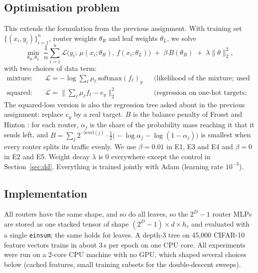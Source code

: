 \subsection{Optimisation problem}
This extends the formulation from the previous assignment. With training set $\{(x_i,y_i)\}_{i=1}^n$, router weights $\theta_R$ and leaf weights $\theta_L$, we solve
\begin{equation}
\min_{\theta_R,\theta_L}\;\frac1n\sum_{i=1}^n \mathcal{L}\bigl(y_i;\,\mu(x_i;\theta_R),\,f(x_i;\theta_L)\bigr)\;+\;\beta\,B(\theta_R)\;+\;\lambda\|\theta\|_2^2 ,
\label{eq:obj}
\end{equation}
with two choices of data term:
\begin{align*}
\text{mixture:}\quad &\mathcal{L}=-\log\textstyle\sum_\ell \mu_\ell\,\mathrm{softmax}(f_\ell)_{y} &&\text{(likelihood of the mixture; used for E1, E3, E4)}\\
\text{squared:}\quad &\mathcal{L}=\bigl\|\textstyle\sum_\ell \mu_\ell f_\ell-e_y\bigr\|_2^2 &&\text{(regression on one-hot targets; used for E2, E5)}
\end{align*}
The squared-loss version is also the regression tree asked about in the previous assignment: replace $e_y$ by a real target. $B$ is the balance penalty of Frosst and Hinton \cite{frosst2017}: for each router, $\alpha_j$ is the share of the probability mass reaching it that it sends left, and $B=\sum_j 2^{-\mathrm{level}(j)}\cdot\tfrac12\bigl(-\log\alpha_j-\log(1-\alpha_j)\bigr)$ is smallest when every router splits its traffic evenly. We use $\beta=0.01$ in E1, E3 and E4 and $\beta=0$ in E2 and E5. Weight decay $\lambda$ is $0$ everywhere except the control in Section~\ref{sec:dd}. Everything is trained jointly with Adam (learning rate $10^{-3}$).

\subsection{Implementation}
All routers have the same shape, and so do all leaves, so the $2^D-1$ router MLPs are stored as one stacked tensor of shape $(2^D-1)\times d\times h_r$ and evaluated with a single \texttt{einsum}; the same holds for leaves. A depth-3 tree on 45{,}000 CIFAR-10 feature vectors trains in about 3\,s per epoch on one CPU core. All experiments were run on a 2-core CPU machine with no GPU, which shaped several choices below (cached features, small training subsets for the double-descent sweeps).

